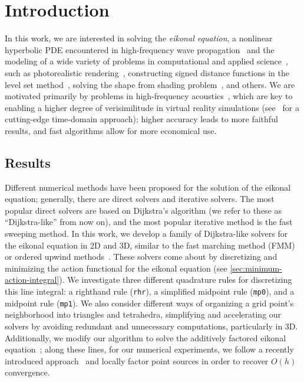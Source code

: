 \documentclass[eikonal.tex]{subfiles}
\begin{document}
\section{Introduction}\label{sec:introduction}

In this work, we are interested in solving the \emph{eikonal
  equation}, a nonlinear hyperbolic PDE encountered in high-frequency
wave propagation~\cite{engquist2003computational} and the modeling of
a wide variety of problems in computational and applied
science~\cite{sethian1999level}, such as photorealistic
rendering~\cite{ihrke2007eikonal}, constructing signed distance
functions in the level set method~\cite{osher2006level}, solving the
shape from shading
problem~\cite{kimmel2001optimal,prados2006shape,durou2008numerical},
and others. We are motivated primarily by problems in high-frequency
acoustics~\cite{prislan2016ray}, which are key to enabling a higher
degree of verisimilitude in virtual reality simulations
(see~\cite{raghuvanshi2014parametric,raghuvanshi2018parametric} for a
cutting-edge time-domain approach); higher accuracy leads to more
faithful results, and fast algorithms allow for more economical use.

\subsection{Results}

Different numerical methods have been proposed for the solution of the
eikonal equation; generally, there are direct solvers and iterative
solvers. The most popular direct solvers are based on Dijkstra's
algorithm (we refer to these as ``Dijkstra-like'' from now on), and
the most popular iterative method is the fast sweeping method. In this
work, we develop a family of Dijkstra-like solvers for the eikonal
equation in 2D and 3D, similar to the fast marching method (FMM) or
ordered upwind
methods~\cite{sethian1996fast,sethian2003ordered}. These solvers come
about by discretizing and minimizing the action functional for the
eikonal equation (see \cref{sec:minimum-action-integral}). We
investigate three different quadrature rules for discretizing this
line integral: a righthand rule (\texttt{rhr}), a simplified midpoint
rule (\texttt{mp0}), and a midpoint rule (\texttt{mp1}). We also
consider different ways of organizing a grid point's neighborhood into
triangles and tetrahedra, simplifying and accelerating our solvers by
avoiding redundant and unnecessary computations, particularly in
3D. Additionally, we modify our algorithm to solve the additively
factored eikonal equation~\cite{luo2012fast}; along these lines, for
our numerical experiments, we follow a recently introduced
approach~\cite{qi2018corner} and locally factor point sources in order
to recover $O(h)$ convergence.
\end{document}

